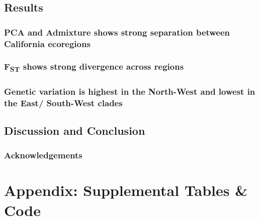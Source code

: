 \documentclass[twoside,12pt,final]{ucthesis-CA2012} %
\begin{document}
\begin{ucmainmatter}
\hypertarget{results-2}{%
\section{Results}\label{results-2}}

\hypertarget{pca-and-admixture-shows-strong-separation-between-california-ecoregions}{%
\subsection{PCA and Admixture shows strong separation between California
ecoregions}\label{pca-and-admixture-shows-strong-separation-between-california-ecoregions}}

\hypertarget{fst-shows-strong-divergence-across-regions}{%
\subsection{\texorpdfstring{F\textsubscript{ST} shows strong divergence
across
regions}{FST shows strong divergence across regions}}\label{fst-shows-strong-divergence-across-regions}}

\hypertarget{genetic-variation-is-highest-in-the-north-west-and-lowest-in-the-east-south-west-clades}{%
\subsection{Genetic variation is highest in the North-West and lowest in
the East/ South-West
clades}\label{genetic-variation-is-highest-in-the-north-west-and-lowest-in-the-east-south-west-clades}}

\hypertarget{discussion-and-conclusion}{%
\section{Discussion and Conclusion}\label{discussion-and-conclusion}}

\hypertarget{acknowledgements-1}{%
\subsection{Acknowledgements}\label{acknowledgements-1}}

\hypertarget{appendix-supplemental-tables-code}{%
\chapter{Appendix: Supplemental Tables \&
Code}\label{appendix-supplemental-tables-code}}


\end{ucmainmatter}
\end{document}
